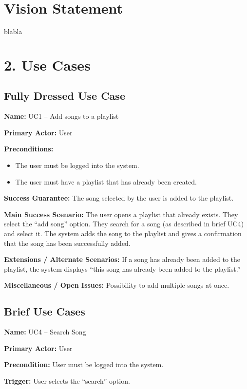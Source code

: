 \documentclass[12pt]{article}
\begin{document}
\section*{Vision Statement}
blabla

\section*{2. Use Cases}

\subsection*{Fully Dressed Use Case}

\textbf{Name:} UC1 -- Add songs to a playlist

\textbf{Primary Actor:} User

\textbf{Preconditions:} 
\begin{itemize}[noitemsep]
  \item The user must be logged into the system. 
  \item The user must have a playlist that has already been created.
\end{itemize}

\textbf{Success Guarantee:}  
The song selected by the user is added to the playlist.

\textbf{Main Success Scenario:}  
The user opens a playlist that already exists. They select the ``add song'' option. They search for a song (as described in brief UC4) and select it. The system adds the song to the playlist and gives a confirmation that the song has been successfully added.

\textbf{Extensions / Alternate Scenarios:}  
If a song has already been added to the playlist, the system displays ``this song has already been added to the playlist.''

\textbf{Miscellaneous / Open Issues:}  
Possibility to add multiple songs at once.

\subsection*{Brief Use Cases}

\textbf{Name:} UC4 -- Search Song  

\textbf{Primary Actor:} User  

\textbf{Precondition:} User must be logged into the system.  

\textbf{Trigger:} User selects the ``search'' option.  
\end{document}
